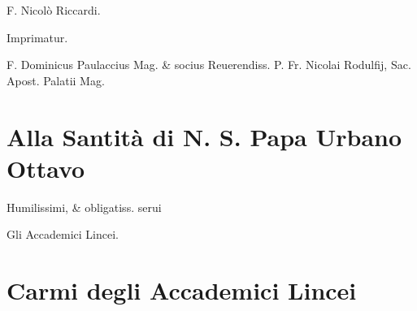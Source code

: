 \documentclass[11pt,twoside,openany]{book}
\begin{document}
F. Nicolò Riccardi.


Imprimatur.


F. Dominicus Paulaccius Mag. \& socius Reuerendiss. P. Fr. Nicolai Rodulfij, Sac. Apost. Palatii Mag.


\chapter*{Alla Santità di N. S. Papa Urbano Ottavo}

Humilissimi, \& obligatiss. serui


Gli Accademici Lincei\textsc{.}


\chapter*{Carmi degli Accademici Lincei}
\end{document}
